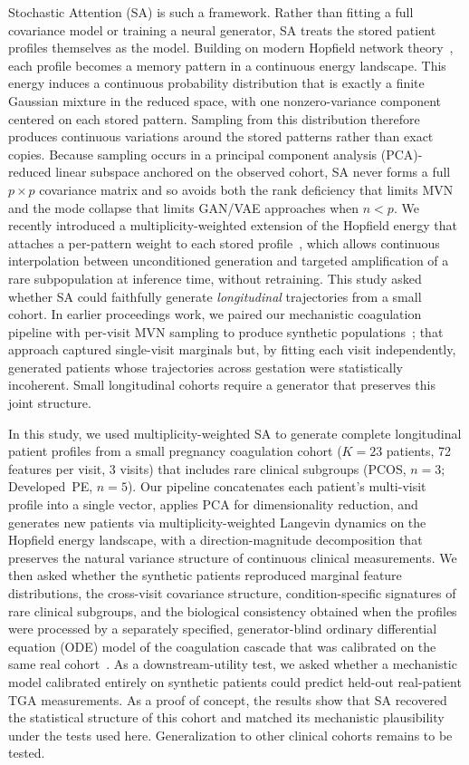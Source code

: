 Stochastic Attention (SA) is such a framework. Rather than fitting a full
covariance model or training a neural generator, SA treats the stored patient
profiles themselves as the model. Building on modern Hopfield network
theory~\citep{Ramsauer2021}, each profile becomes a memory pattern in a
continuous energy landscape. This energy induces a continuous probability
distribution that is exactly a finite Gaussian mixture in the reduced space,
with one nonzero-variance component centered on each stored pattern. Sampling
from this distribution therefore produces continuous variations around the
stored patterns rather than exact copies. Because sampling occurs in a
principal component analysis (PCA)-reduced linear subspace anchored on the observed cohort, SA never forms a
full $p \times p$ covariance matrix and so avoids both the rank deficiency that
limits MVN and the mode collapse that limits GAN/VAE approaches when $n < p$.
We recently introduced a multiplicity-weighted extension of the Hopfield energy
that attaches a per-pattern weight to each stored profile~\citep{Varner2026Multiplicity},
which allows continuous interpolation
between unconditioned generation and targeted amplification of a rare
subpopulation at inference time, without retraining. This study asked whether SA could
faithfully generate \emph{longitudinal}
trajectories from a small cohort. In earlier proceedings work, we paired our
mechanistic coagulation pipeline with per-visit MVN sampling to produce
synthetic populations~\citep{Varner2023JuliaCon}; that approach captured
single-visit marginals but, by fitting each visit independently, generated
patients whose trajectories across gestation were statistically incoherent. Small
longitudinal cohorts require a generator that preserves this joint structure.

In this study, we used multiplicity-weighted SA to generate complete
longitudinal patient profiles from a small pregnancy coagulation cohort
($K{=}23$ patients, 72 features per visit, 3 visits) that includes rare
clinical subgroups (PCOS, $n{=}3$; Developed~PE, $n{=}5$). Our pipeline
concatenates each patient's multi-visit profile into a single vector, applies
PCA for dimensionality reduction, and generates new patients via
multiplicity-weighted Langevin dynamics on the Hopfield energy landscape, with
a direction-magnitude decomposition that preserves the natural variance
structure of continuous clinical measurements. We then asked whether the
synthetic patients reproduced marginal feature distributions, the cross-visit
covariance structure, condition-specific signatures of rare clinical
subgroups, and the biological consistency obtained when the profiles were processed by
a separately specified, generator-blind ordinary differential equation (ODE) model
of the coagulation cascade that was calibrated on the same real
cohort~\citep{BrummelZiedins2012}. As a downstream-utility test, we
asked whether a mechanistic model calibrated entirely on synthetic patients
could predict held-out real-patient TGA measurements. As a proof of concept, the
results show that SA recovered the statistical structure of this cohort and matched its
mechanistic plausibility under the tests used here. Generalization to other clinical cohorts
remains to be tested.
